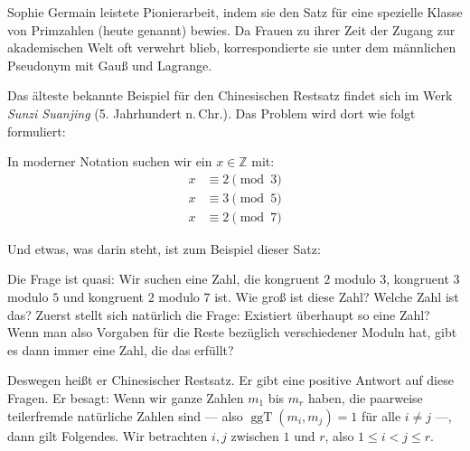 \begin{didactic-insight}
Sophie Germain leistete Pionierarbeit, indem sie den Satz für eine spezielle Klasse von Primzahlen (heute  genannt) bewies. Da Frauen zu ihrer Zeit der Zugang zur akademischen Welt oft verwehrt blieb, korrespondierte sie unter dem männlichen Pseudonym  mit Gauß und Lagrange.
\end{didactic-insight}

\begin{didactic-insight}
Das älteste bekannte Beispiel für den Chinesischen Restsatz findet sich im Werk \emph{Sunzi Suanjing} (5. Jahrhundert n.\,Chr.). Das Problem wird dort wie folgt formuliert:
\begin{quote}
\end{quote}
In moderner Notation suchen wir ein $x \in \mathbb{Z}$ mit:
\begin{align*}
    x &\equiv 2 \pmod 3 \\
    x &\equiv 3 \pmod 5 \\
    x &\equiv 2 \pmod 7
\end{align*}
\end{didactic-insight}

\begin{spoken-clean}[01:02:39 - 01:05:09]
Und etwas, was darin steht, ist zum Beispiel dieser Satz: 

Die Frage ist quasi: Wir suchen eine Zahl, die kongruent $2$ modulo $3$, kongruent $3$ modulo $5$ und kongruent $2$ modulo $7$ ist. Wie groß ist diese Zahl? Welche Zahl ist das? Zuerst stellt sich natürlich die Frage: Existiert überhaupt so eine Zahl? Wenn man also Vorgaben für die Reste bezüglich verschiedener Moduln hat, gibt es dann immer eine Zahl, die das erfüllt?

Deswegen heißt er Chinesischer Restsatz. Er gibt eine positive Antwort auf diese Fragen.  Er besagt: Wenn wir ganze Zahlen $m_1$ bis $m_r$ haben, die paarweise teilerfremde natürliche Zahlen sind --- also $\operatorname{ggT}(m_i, m_j) = 1$ für alle $i \neq j$ ---, dann gilt Folgendes. Wir betrachten $i, j$ zwischen $1$ und $r$, also $1 \le i < j \le r$.
\end{spoken-clean}

